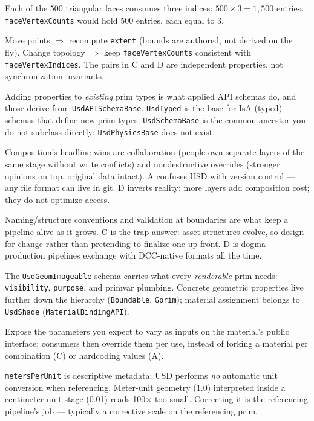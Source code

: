 Each of the 500 triangular faces consumes three indices:
$500 \times 3 = 1{,}500$ entries. \texttt{faceVertexCounts} would hold 500
entries, each equal to 3.

Move points $\Rightarrow$ recompute \texttt{extent} (bounds are
authored, not derived on the fly). Change topology $\Rightarrow$ keep
\texttt{faceVertexCounts} consistent with \texttt{faceVertexIndices}. The
pairs in C and D are independent properties, not synchronization invariants.

Adding properties to \emph{existing} prim types is what applied API
schemas do, and those derive from
\texttt{UsdAPISchemaBase}. \texttt{UsdTyped} is the base for IsA (typed)
schemas that define new prim types; \texttt{UsdSchemaBase} is the common
ancestor you do not subclass directly; \texttt{UsdPhysicsBase} does not exist.

Composition's headline wins are collaboration (people own separate layers of
the same stage without write conflicts) and nondestructive overrides (stronger
opinions on top, original data intact). A confuses USD with version control
--- any file format can live in git. D inverts reality: more layers add
composition cost; they do not optimize access.

Naming/structure conventions and validation at boundaries are what keep a
pipeline alive as it grows. C is the trap answer: asset structures evolve, so
design for change rather than pretending to finalize one up front. D is dogma
--- production pipelines exchange with DCC-native formats all the time.

The \texttt{UsdGeomImageable} schema carries what
every \emph{renderable} prim needs: \texttt{visibility}, \texttt{purpose},
and primvar plumbing. Concrete geometric properties live further down the
hierarchy (\texttt{Boundable}, \texttt{Gprim}); material assignment belongs to
\texttt{UsdShade} (\texttt{MaterialBindingAPI}).

Expose the parameters you expect to vary as inputs on the material's public
interface; consumers then override them per use, instead of forking a material
per combination (C) or hardcoding values (A).

\texttt{metersPerUnit} is descriptive metadata; USD
performs \emph{no} automatic unit conversion when referencing. Meter-unit
geometry (1.0) interpreted inside a centimeter-unit stage (0.01) reads
100$\times$ too small. Correcting it is the referencing pipeline's job ---
typically a corrective scale on the referencing prim.

